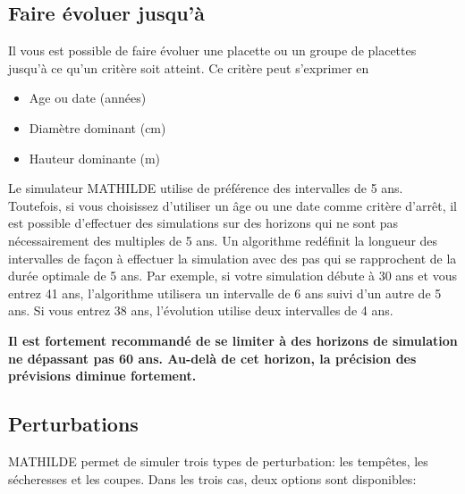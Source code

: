 \documentclass[a4paper,12pt]{article}
\begin{document}
\subsection{Faire évoluer jusqu'à}

Il vous est possible de faire évoluer une placette ou un groupe de placettes jusqu'à ce qu'un critère soit atteint. Ce critère peut s'exprimer en 

\begin{itemize}
\item Age ou date (années)
\item Diamètre dominant (cm)
\item Hauteur dominante (m)
\end{itemize}

Le simulateur MATHILDE utilise de préférence des intervalles de 5 ans. Toutefois, si vous choisissez d'utiliser un âge ou une date comme critère d'arrêt, il est possible d'effectuer des simulations sur des horizons qui ne sont pas nécessairement des multiples de 5 ans. Un algorithme redéfinit la longueur des intervalles de façon à effectuer la simulation avec des pas qui se rapprochent de la durée optimale de 5 ans. Par exemple, si votre simulation débute à 30 ans et vous entrez 41 ans, l'algorithme utilisera un intervalle de 6 ans suivi d'un autre de 5 ans. Si vous entrez 38 ans, l'évolution utilise deux intervalles de 4 ans. 

\textbf{Il est fortement recommandé de se limiter à des horizons de simulation ne dépassant pas 60 ans. Au-delà de cet horizon, la précision des prévisions diminue fortement.}

\subsection{Perturbations}

MATHILDE permet de simuler trois types de perturbation: les tempêtes, les sécheresses et les coupes. Dans les trois cas, deux options sont disponibles:
\end{document}
